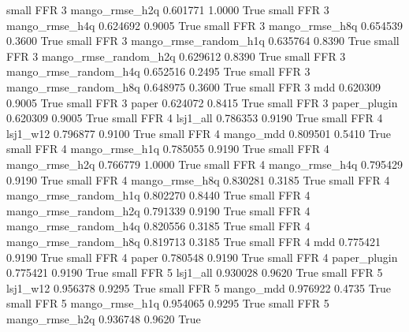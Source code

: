      small      FFR                 3        mango_rmse_h2q   0.601771      1.0000    True
     small      FFR                 3        mango_rmse_h4q   0.624692      0.9005    True
     small      FFR                 3        mango_rmse_h8q   0.654539      0.3600    True
     small      FFR                 3 mango_rmse_random_h1q   0.635764      0.8390    True
     small      FFR                 3 mango_rmse_random_h2q   0.629612      0.8390    True
     small      FFR                 3 mango_rmse_random_h4q   0.652516      0.2495    True
     small      FFR                 3 mango_rmse_random_h8q   0.648975      0.3600    True
     small      FFR                 3                   mdd   0.620309      0.9005    True
     small      FFR                 3                 paper   0.624072      0.8415    True
     small      FFR                 3          paper_plugin   0.620309      0.9005    True
     small      FFR                 4              lsj1_all   0.786353      0.9190    True
     small      FFR                 4              lsj1_w12   0.796877      0.9100    True
     small      FFR                 4             mango_mdd   0.809501      0.5410    True
     small      FFR                 4        mango_rmse_h1q   0.785055      0.9190    True
     small      FFR                 4        mango_rmse_h2q   0.766779      1.0000    True
     small      FFR                 4        mango_rmse_h4q   0.795429      0.9190    True
     small      FFR                 4        mango_rmse_h8q   0.830281      0.3185    True
     small      FFR                 4 mango_rmse_random_h1q   0.802270      0.8440    True
     small      FFR                 4 mango_rmse_random_h2q   0.791339      0.9190    True
     small      FFR                 4 mango_rmse_random_h4q   0.820556      0.3185    True
     small      FFR                 4 mango_rmse_random_h8q   0.819713      0.3185    True
     small      FFR                 4                   mdd   0.775421      0.9190    True
     small      FFR                 4                 paper   0.780548      0.9190    True
     small      FFR                 4          paper_plugin   0.775421      0.9190    True
     small      FFR                 5              lsj1_all   0.930028      0.9620    True
     small      FFR                 5              lsj1_w12   0.956378      0.9295    True
     small      FFR                 5             mango_mdd   0.976922      0.4735    True
     small      FFR                 5        mango_rmse_h1q   0.954065      0.9295    True
     small      FFR                 5        mango_rmse_h2q   0.936748      0.9620    True
